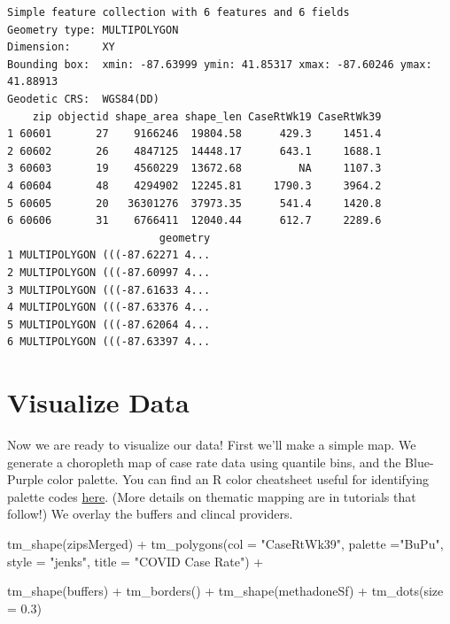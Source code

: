 \documentclass[
  letterpaper,
  DIV=11,
  numbers=noendperiod]{scrreprt}
\newenvironment{Shaded}{\begin{snugshade}}{\end{snugshade}}
\newcommand{\AttributeTok}[1]{\textcolor[rgb]{0.40,0.45,0.13}{#1}}
\newcommand{\FloatTok}[1]{\textcolor[rgb]{0.68,0.00,0.00}{#1}}
\newcommand{\FunctionTok}[1]{\textcolor[rgb]{0.28,0.35,0.67}{#1}}
\newcommand{\NormalTok}[1]{\textcolor[rgb]{0.00,0.23,0.31}{#1}}
\newcommand{\SpecialCharTok}[1]{\textcolor[rgb]{0.37,0.37,0.37}{#1}}
\newcommand{\StringTok}[1]{\textcolor[rgb]{0.13,0.47,0.30}{#1}}
\begin{document}
\begin{verbatim}
Simple feature collection with 6 features and 6 fields
Geometry type: MULTIPOLYGON
Dimension:     XY
Bounding box:  xmin: -87.63999 ymin: 41.85317 xmax: -87.60246 ymax: 41.88913
Geodetic CRS:  WGS84(DD)
    zip objectid shape_area shape_len CaseRtWk19 CaseRtWk39
1 60601       27    9166246  19804.58      429.3     1451.4
2 60602       26    4847125  14448.17      643.1     1688.1
3 60603       19    4560229  13672.68         NA     1107.3
4 60604       48    4294902  12245.81     1790.3     3964.2
5 60605       20   36301276  37973.35      541.4     1420.8
6 60606       31    6766411  12040.44      612.7     2289.6
                        geometry
1 MULTIPOLYGON (((-87.62271 4...
2 MULTIPOLYGON (((-87.60997 4...
3 MULTIPOLYGON (((-87.61633 4...
4 MULTIPOLYGON (((-87.63376 4...
5 MULTIPOLYGON (((-87.62064 4...
6 MULTIPOLYGON (((-87.63397 4...
\end{verbatim}

\section{Visualize Data}\label{visualize-data}

Now we are ready to visualize our data! First we'll make a simple map.
We generate a choropleth map of case rate data using quantile bins, and
the Blue-Purple color palette. You can find an R color cheatsheet useful
for identifying palette codes
\href{https://www.nceas.ucsb.edu/sites/default/files/2020-04/colorPaletteCheatsheet.pdf}{here}.
(More details on thematic mapping are in tutorials that follow!) We
overlay the buffers and clincal providers.

\begin{Shaded}
\begin{Highlighting}[]
\FunctionTok{tm\_shape}\NormalTok{(zipsMerged) }\SpecialCharTok{+}
  \FunctionTok{tm\_polygons}\NormalTok{(}\AttributeTok{col =} \StringTok{"CaseRtWk39"}\NormalTok{, }
              \AttributeTok{palette =}\StringTok{"BuPu"}\NormalTok{,}
              \AttributeTok{style =} \StringTok{"jenks"}\NormalTok{,}
              \AttributeTok{title =} \StringTok{"COVID Case Rate"}\NormalTok{) }\SpecialCharTok{+}
  
  \FunctionTok{tm\_shape}\NormalTok{(buffers) }\SpecialCharTok{+} \FunctionTok{tm\_borders}\NormalTok{() }\SpecialCharTok{+}
  \FunctionTok{tm\_shape}\NormalTok{(methadoneSf) }\SpecialCharTok{+} \FunctionTok{tm\_dots}\NormalTok{(}\AttributeTok{size =} \FloatTok{0.3}\NormalTok{) }
\end{Highlighting}
\end{Shaded}
\end{document}
